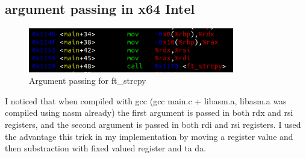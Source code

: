\documentclass{article}
\begin{document}
\subsection{argument passing in x64 Intel}
\begin{figure}[H]
    \centering
    \includegraphics[width=0.8\textwidth]{trick.png}
    \caption{Argument passing for ft\_strcpy}
    \label{fig:trick}
\end{figure}

I noticed that when compiled with gcc (gcc main.c + libasm.a, libasm.a was compiled using nasm already) the first argument is passed in both rdx and rsi registers, and the second argument is passed in both rdi and rsi registers. I used the advantage this trick in my implementation by moving a register value and then substraction with fixed valued register and ta da.
\end{document}
